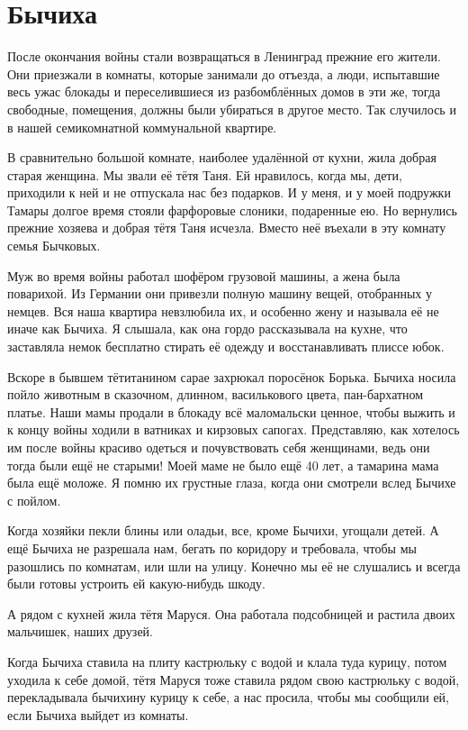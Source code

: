 \section*{Бычиха}


После окончания войны стали возвращаться в Ленинград прежние его жители.
Они приезжали в комнаты, которые занимали до отъезда, а люди, испытавшие весь ужас блокады и переселившиеся из разбомблённых домов в эти же, тогда свободные, помещения, должны были убираться в другое место.
Так случилось и в нашей семикомнатной коммунальной квартире.

В сравнительно большой комнате, наиболее удалённой от кухни, жила добрая старая женщина.
Мы звали её тётя Таня.
Ей нравилось, когда мы, дети, приходили к ней и не отпускала нас без подарков.
И у меня, и у моей подружки Тамары долгое время стояли фарфоровые слоники, подаренные ею.
Но вернулись прежние хозяева и добрая тётя Таня исчезла.
Вместо неё въехали в эту комнату семья Бычковых.

Муж во время войны работал шофёром грузовой машины, а жена была поварихой.
Из Германии они привезли полную машину вещей, отобранных у немцев.
Вся наша квартира невзлюбила их, и особенно жену и называла её не иначе как Бычиха.
Я слышала, как она гордо рассказывала на кухне, что заставляла немок бесплатно стирать её одежду и восстанавливать плиссе юбок.

Вскоре в бывшем тётитанином сарае захрюкал поросёнок Борька.
Бычиха носила пойло животным в сказочном, длинном, василькового цвета, пан-бархатном платье.
Наши мамы продали в блокаду всё маломальски ценное, чтобы выжить и к концу войны ходили в ватниках и кирзовых сапогах.
Представляю, как хотелось им после войны красиво одеться и почувствовать себя женщинами, ведь они тогда были ещё не старыми! 
Моей маме не было ещё 40 лет, а тамарина мама была ещё моложе.
Я помню их грустные глаза, когда они смотрели вслед Бычихе с пойлом.

Когда хозяйки пекли блины или оладьи, все, кроме Бычихи, угощали детей.
А ещё Бычиха не разрешала нам, бегать по коридору и требовала, чтобы мы разошлись по комнатам, или шли на улицу.
Конечно мы её не слушались и всегда были готовы устроить ей какую-нибудь шкоду.

А рядом с кухней жила тётя Маруся.
Она работала подсобницей и растила двоих мальчишек, наших друзей.

Когда Бычиха ставила на плиту кастрюльку с водой и клала туда курицу, потом уходила к себе домой, тётя Маруся тоже ставила рядом свою кастрюльку с водой, перекладывала бычихину курицу к себе, а нас просила, чтобы мы сообщили ей, если Бычиха выйдет из комнаты.

